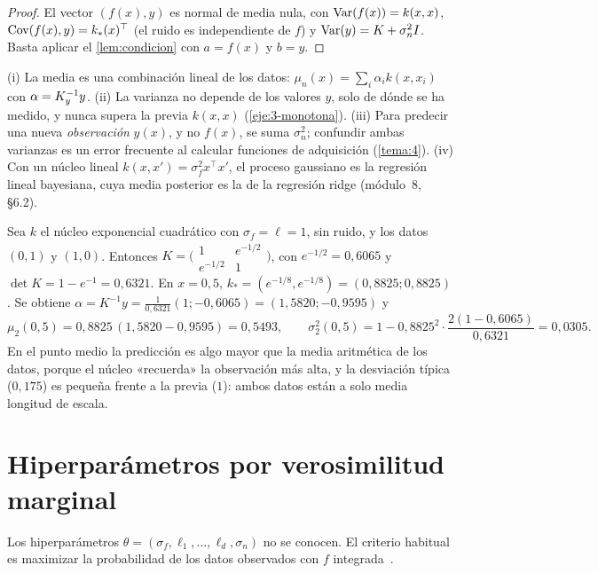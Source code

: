 \begin{proof}
El vector $(f(x),y)$ es normal de media nula, con $\operatorname{Var}(f(x))=k(x,x)$, $\operatorname{Cov}(f(x),y)=k_*(x)^\top$ (el ruido es independiente de $f$) y $\operatorname{Var}(y)=K+\sigma_n^2I$. Basta aplicar el \cref{lem:condicion} con $a=f(x)$ y $b=y$.
\end{proof}

\begin{observacion}\label{obs:posterior}
(i) La media es una combinación lineal de los datos: $\mu_n(x)=\sum_i\alpha_ik(x,x_i)$ con $\alpha=K_{y}^{-1}y$. (ii) La varianza no depende de los valores $y$, solo de dónde se ha medido, y nunca supera la previa $k(x,x)$ (\cref{eje:3-monotona}). (iii) Para predecir una nueva \emph{observación} $y(x)$, y no $f(x)$, se suma $\sigma_n^2$; confundir ambas varianzas es un error frecuente al calcular funciones de adquisición (\cref{tema:4}). (iv) Con un núcleo lineal $k(x,x')=\sigma_f^2x^\top x'$, el proceso gaussiano es la regresión lineal bayesiana, cuya media posterior es la de la regresión ridge (módulo~8, §6.2).
\end{observacion}

\begin{ejemplo}\label{ej:gp2}
Sea $k$ el núcleo exponencial cuadrático con $\sigma_f=\ell=1$, sin ruido, y los datos $(0,1)$ y $(1,0)$. Entonces $K=\bigl(\begin{smallmatrix}1&e^{-1/2}\\e^{-1/2}&1\end{smallmatrix}\bigr)$, con $e^{-1/2}=0{,}6065$ y $\det K=1-e^{-1}=0{,}6321$. En $x=0{,}5$, $k_*=(e^{-1/8},e^{-1/8})=(0{,}8825;0{,}8825)$. Se obtiene $\alpha=K^{-1}y=\frac{1}{0{,}6321}(1;-0{,}6065)=(1{,}5820;-0{,}9595)$ y
\[
\mu_2(0{,}5)=0{,}8825\,(1{,}5820-0{,}9595)=0{,}5493,\qquad
\sigma_2^2(0{,}5)=1-0{,}8825^2\cdot\frac{2(1-0{,}6065)}{0{,}6321}=0{,}0305 .
\]
En el punto medio la predicción es algo mayor que la media aritmética de los datos, porque el núcleo «recuerda» la observación más alta, y la desviación típica ($0{,}175$) es pequeña frente a la previa ($1$): ambos datos están a solo media longitud de escala.
\end{ejemplo}

\section{Hiperparámetros por verosimilitud marginal}

Los hiperparámetros $\theta=(\sigma_f,\ell_1,\dots,\ell_d,\sigma_n)$ no se conocen. El criterio habitual es maximizar la probabilidad de los datos observados con $f$ integrada~\cite[cap.~5]{rw}.

